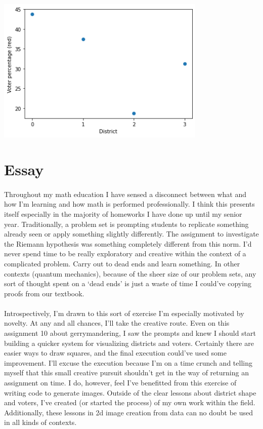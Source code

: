 \documentclass[12pt]{article}
\numberwithin{equation}{section}
\begin{document}
    \begin{center}
        \includegraphics[width=0.75\textwidth]{figures/percentage20.png}
    \end{center}

    \setcounter{section}{7}
    \section{Essay}
    \paragraph{} Throughout my math education I have sensed a disconnect between what and how I'm learning and how math is performed professionally. I think this presents itself especially in the majority of homeworks I have done up until my senior year. Traditionally, a problem set is prompting students to replicate something already seen or apply something slightly differently. The assignment to investigate the Riemann hypothesis was something completely different from this norm. I'd never spend time to be really exploratory and creative within the context of a complicated problem. Carry out to dead ends and learn something. In other contexts (quantum mechanics), because of the sheer size of our problem sets, any sort of thought spent on a `dead ends' is just a waste of time I could've copying proofs from our textbook.
    \paragraph{} Introspectively, I'm drawn to this sort of exercise I'm especially motivated by novelty. At any and all chances, I'll take the creative route. Even on this assignment 10 about gerrymandering, I saw the prompts and knew I should start building a quicker system for visualizing districts and voters. Certainly there are easier ways to draw squares, and the final execution could've used some improvement. I'll excuse the execution because I'm on a time crunch and telling myself that this small creative pursuit shouldn't get in the way of returning an assignment on time. I do, however, feel I've benefitted from this exercise of writing code to generate images. Outside of the clear lessons about district shape and voters, I've created (or started the process) of my own work within the field. Additionally, these lessons in 2d image creation from data can no doubt be used in all kinds of contexts.
\end{document}
